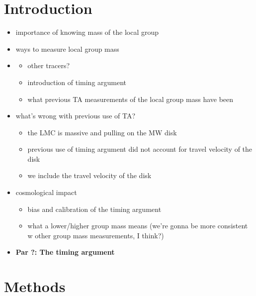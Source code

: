 \documentclass[twocolumn]{aastex631}
\newcommand{\kc}[1]{\textcolor{pink}{\textbf{#1}} }
\begin{document}
\section{Introduction}
\label{sec:intro}

\begin{itemize}
    \item importance of knowing mass of the local group
    \item ways to measure local group mass
    \item \begin{itemize}
            \item other tracers?
            \item introduction of timing argument
            \item what previous TA measurements of the local group mass have been
          \end{itemize}
    \item what's wrong with previous use of TA?
        \begin{itemize}
            \item the LMC is massive and pulling on the MW disk
            \item previous use of timing argument did not account for travel velocity of the disk
            \item we include the travel velocity of the disk
        \end{itemize}
    \item cosmological impact
        \begin{itemize}
            \item bias and calibration of the timing argument
            \item what a lower/higher group mass means (we're gonna be more consistent w other group mass measurements, I think?)
        \end{itemize}
    \item\textbf{Par ?: The timing argument }

\end{itemize}

\section{Methods}\label{sec:methods}
\end{document}
